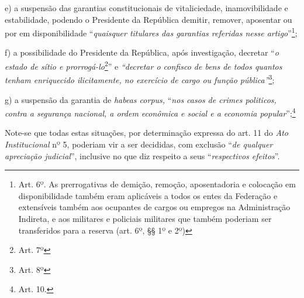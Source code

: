 e) a suspensão das garantias constitucionais de vitaliciedade,
inamovibilidade e estabilidade, podendo o Presidente da República
demitir, remover, aposentar ou por em disponibilidade ``\emph{quaisquer
titulares das garantias referidas nesse artigo}''\footnote{Art. 6º. As
  prerrogativas de demição, remoção, aposentadoria e colocação em
  disponibilidade também eram aplicáveis a todos os entes da Federação e
  extensíveis também aos ocupantes de cargos ou empregos na
  Administração Indireta, e aos militares e policiais militares que
  também poderiam ser transferidos para a reserva (art. 6º, §§ 1º e 2º)};

f) a possibilidade do Presidente da República, após investigação,
decretar ``\emph{o estado de sítio e prorrogá-lo}\footnote{Art. 7º}'' e
\emph{``decretar o confisco de bens de todos quantos tenham enriquecido
ilicitamente, no exercício de cargo ou função pública''}\footnote{Art.
  8º};

g) a suspensão da garantia de \emph{habeas corpus,} ``\emph{nos casos de
crimes politicos, contra a segurança nacional, a ordem econômica e
social e a economia popular}'';\footnote{Art. 10.}

Note-se que todas estas situações, por determinação expressa do art. 11
do \emph{Ato Institucional} nº 5, poderiam vir a ser decididas, com
exclusão ``\emph{de qualquer apreciação judicial}'', inclusive no que
diz respeito a seus ``\emph{respectivos efeitos}''.

